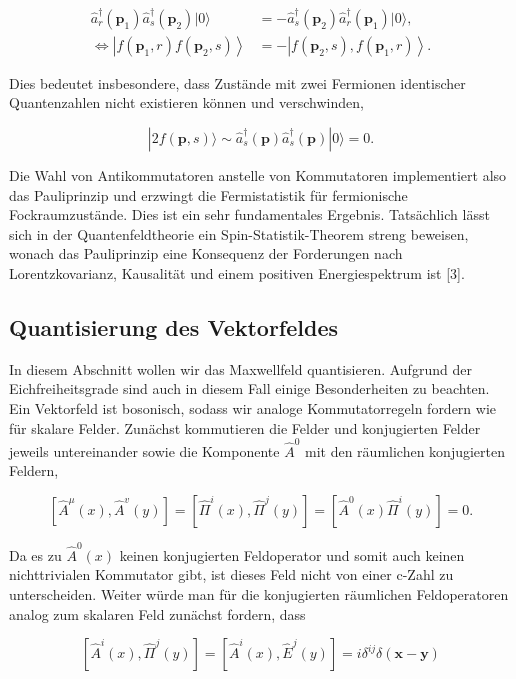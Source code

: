 \documentclass[10pt, letterpaper]{article}
\begin{document}
$$
\begin{aligned}
\hat{a}_{r}^{\dagger}\left(\mathbf{p}_{1}\right) \hat{a}_{s}^{\dagger}\left(\mathbf{p}_{2}\right)|0\rangle & =-\hat{a}_{s}^{\dagger}\left(\mathbf{p}_{2}\right) \hat{a}_{r}^{\dagger}\left(\mathbf{p}_{1}\right)|0\rangle, \\
\Leftrightarrow\left|f\left(\mathbf{p}_{1}, r\right) f\left(\mathbf{p}_{2}, s\right)\right\rangle & =-\left|f\left(\mathbf{p}_{2}, s\right), f\left(\mathbf{p}_{1}, r\right)\right\rangle .
\end{aligned}
$$

Dies bedeutet insbesondere, dass Zustände mit zwei Fermionen identischer Quantenzahlen nicht existieren können und verschwinden,

$$
|2 f(\mathbf{p}, s)\rangle \sim \hat{a}_{s}^{\dagger}(\mathbf{p}) \hat{a}_{s}^{\dagger}(\mathbf{p})|0\rangle=0 .
$$

Die Wahl von Antikommutatoren anstelle von Kommutatoren implementiert also das Pauliprinzip und erzwingt die Fermistatistik für fermionische Fockraumzustände. Dies ist ein sehr fundamentales Ergebnis. Tatsächlich lässt sich in der Quantenfeldtheorie ein Spin-Statistik-Theorem streng beweisen, wonach das Pauliprinzip eine Konsequenz der Forderungen nach Lorentzkovarianz, Kausalität und einem positiven Energiespektrum ist [3].

\subsection*{Quantisierung des Vektorfeldes}
In diesem Abschnitt wollen wir das Maxwellfeld quantisieren. Aufgrund der Eichfreiheitsgrade sind auch in diesem Fall einige Besonderheiten zu beachten. Ein Vektorfeld ist bosonisch, sodass wir analoge Kommutatorregeln fordern wie für skalare Felder. Zunächst kommutieren die Felder und konjugierten Felder jeweils untereinander sowie die Komponente $\hat{A}^{0}$ mit den räumlichen konjugierten Feldern,

$$
\left[\hat{A}^{\mu}(x), \hat{A}^{v}(y)\right]=\left[\hat{\Pi}^{i}(x), \hat{\Pi}^{j}(y)\right]=\left[\hat{A}^{0}(x) \hat{\Pi}^{i}(y)\right]=0 .
$$

Da es zu $\hat{A}^{0}(x)$ keinen konjugierten Feldoperator und somit auch keinen nichttrivialen Kommutator gibt, ist dieses Feld nicht von einer c-Zahl zu unterscheiden. Weiter würde man für die konjugierten räumlichen Feldoperatoren analog zum skalaren Feld zunächst fordern, dass

$$
\left[\hat{A}^{i}(x), \hat{\Pi}^{j}(y)\right]=\left[\hat{A}^{i}(x), \hat{E}^{j}(y)\right]=i \delta^{i j} \delta(\mathbf{x}-\mathbf{y})
$$
\end{document}
